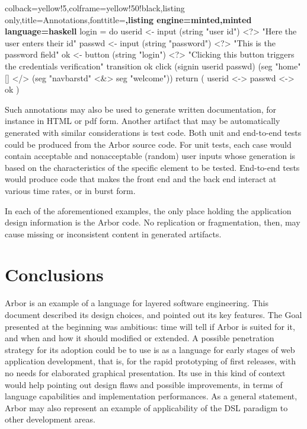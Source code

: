 \documentclass[12pt]{article} %
\newcommand{\be}{back end}
\newcommand{\fe}{front end}
\newcommand{\DSL}{DSL}
\newcommand{\A}{Arbor}
\begin{document}
\begin{tcblisting}{colback=yellow!5,colframe=yellow!50!black,listing only,title=Annotations,fonttitle=\bfseries,listing engine=minted,minted language=haskell}
login = do 
    userid  <- input (string "user id")  <?> "Here the user enters their id"
    passwd  <- input (string "password") <?> "This is the password field"
    ok      <- button (string "login")   <?> "Clicking this button triggers
                                              the credentials verification"
    transition ok click 
    	(signin userid passwd) 
        (seg "home" [] </> (seg "navbarstd" <&> seg "welcome"))
    return (    userid
            <-> passwd
            <-> ok
           )
\end{tcblisting}
Such annotations may also be used to generate written documentation, for instance in HTML or pdf form. 
Another artifact that may be automatically generated with similar considerations is test code. Both unit and end-to-end tests could be produced from the \A{} source code. For unit tests, each case would contain acceptable and nonacceptable (random) user inputs whose generation is based on the characteristics of the specific element to be tested. End-to-end tests would produce code that makes the \fe{} and the \be{} interact at various time rates, or in burst form. 

In each of the aforementioned examples, the only place holding the application design information is the \A{} code. No replication or fragmentation, then, may cause missing or inconsistent content in generated artifacts.
\section{Conclusions}
\A{} is an example of a language for layered software engineering. This document described its design choices, and pointed out its key features. The Goal presented at the beginning was ambitious: time will tell if \A{} is suited for it, and when and how it should modified or extended. A possible penetration strategy for its adoption could be to use is as a language for early stages of web application development, that is, for the rapid prototyping of first releases, with no needs for elaborated graphical presentation. Its use in this kind of context would help pointing out design flaws and possible improvements, in terms of language capabilities and implementation performances. As a general statement, \A{} may also represent an example of applicability of the \DSL{} paradigm to other development areas.
\newpage
\end{document}
